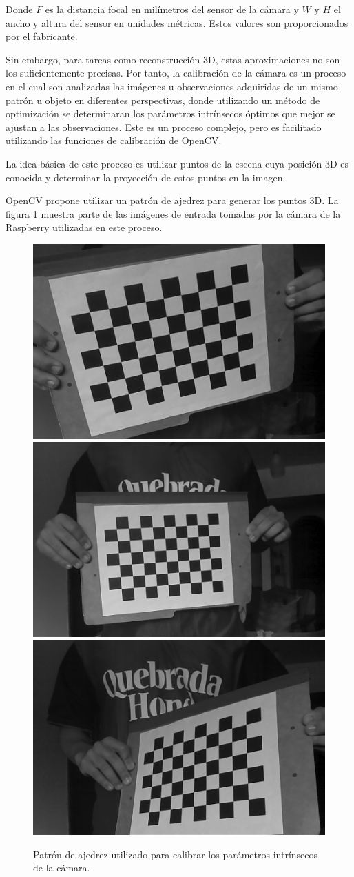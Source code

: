 Donde $F$ es la distancia focal en milímetros del sensor de la cámara y $W$ y $H$ el ancho y altura del sensor en unidades métricas. Estos valores son proporcionados por el fabricante.

Sin embargo, para tareas como reconstrucción 3D, estas aproximaciones no son los suficientemente precisas. Por tanto, la calibración de la cámara es un proceso en el cual son analizadas las imágenes u observaciones  adquiridas de un mismo patrón u objeto en diferentes perspectivas, donde utilizando un método de optimización se determinaran los parámetros intrínsecos óptimos  que mejor se ajustan a las observaciones. Este es un proceso complejo, pero es facilitado utilizando las funciones de calibración de OpenCV.



La idea básica de este proceso es utilizar puntos de la escena cuya posición 3D es conocida y determinar la proyección de estos puntos en la imagen.

OpenCV propone utilizar un patrón de ajedrez para generar los puntos 3D. La figura \ref{imagen:CalibracionCamara} muestra parte de las imágenes de entrada tomadas por  la cámara de la Raspberry utilizadas en este proceso. 

\begin{figure}[H]
	\centering
	\includegraphics[width=0.3\linewidth]{imagenes/prototipo/Calibracion/frame_010}
	\includegraphics[width=0.3\linewidth]{imagenes/prototipo/Calibracion/frame_021}			\includegraphics[width=0.3\linewidth]{imagenes/prototipo/Calibracion/frame_031}
	\caption[Calibración de la cámara]{Patrón de ajedrez utilizado para calibrar los parámetros intrínsecos de la  cámara.}
	\label{imagen:CalibracionCamara}
\end{figure}

